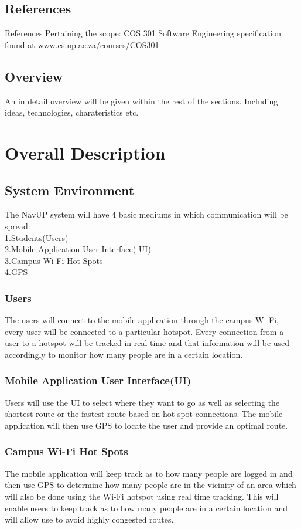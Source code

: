 \documentclass{article}
\begin{document}
\subsection{References}
References Pertaining the scope:
COS 301 Software Engineering specification found at www.cs.up.ac.za/courses/COS301
\subsection{Overview}
An in detail overview will be given within the rest of the sections. Including ideas, technologies, charateristics etc.
\newpage
\centering
\section{Overall Description}
\subsection{System Environment}
The NavUP system will have 4  basic mediums in which communication will be spread: \\ 1.Students(Users) \\ 2.Mobile Application User Interface( UI)\\ 3.Campus Wi-Fi Hot Spots \\ 4.GPS 
\subsubsection{Users}
The users will connect to the mobile application through the campus Wi-Fi, every user will be connected to a particular hotspot. Every connection from a user to a hotspot will be tracked in real time and that information will be used accordingly to monitor how many people are in a certain location.
\subsubsection {Mobile Application User Interface(UI)}
Users will use the UI to select where they want to go as well as selecting the shortest route or the fastest route based on hot-spot connections. The mobile application will then use GPS to locate the user and provide an optimal route.
\subsubsection {Campus Wi-Fi Hot Spots}
The mobile application will keep track as to how many people are logged in and then use GPS to determine how many people are in the vicinity of an area which will also be done using the Wi-Fi hotspot using real time tracking. This will enable users to keep track as to how many people are in a certain location and will allow use to avoid highly congested routes. 
\end{document}
